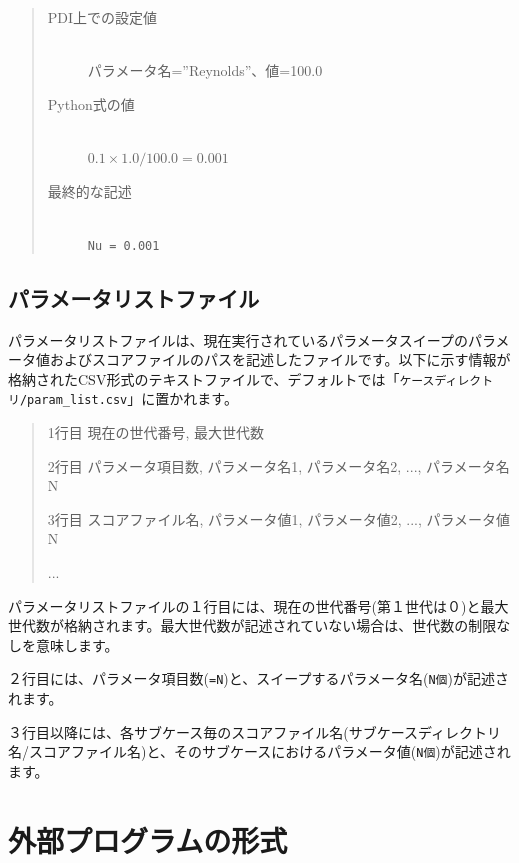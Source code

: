 \documentclass[a4paper,11pt]{jarticle}
\begin{document}
{\begin{quote}
\begin{description}
\item[PDI上での設定値] {\ }\\
パラメータ名=''Reynolds''、値=100.0

\item[Python式の値]  {\ }\\
$0.1 \times 1.0 \slash 100.0 = 0.001$

\item[最終的な記述]  {\ }\\
{\tt Nu = 0.001}
\end{description}
\end{quote}


\newpage
\subsection{{\large{}パラメータリストファイル}}

パラメータリストファイルは、現在実行されているパラメータスイープのパラメータ値およびスコアファイルのパスを記述したファイルです。以下に示す情報が格納されたCSV形式のテキストファイルで、デフォルトでは「{\tt ケースディレクトリ/param\_list.csv}」に置かれます。
\begin{tt}
\begin{quote}
1行目 現在の世代番号,  最大世代数

2行目 パラメータ項目数,  パラメータ名1,  パラメータ名2, ...,  パラメータ名N

3行目 スコアファイル名,  パラメータ値1,  パラメータ値2, ...,  パラメータ値N

...

\end{quote}
\end{tt}

パラメータリストファイルの１行目には、現在の世代番号(第１世代は０)と最大世代数が格納されます。最大世代数が記述されていない場合は、世代数の制限なしを意味します。

２行目には、パラメータ項目数({\tt =N})と、スイープするパラメータ名({\tt N個})が記述されます。

３行目以降には、各サブケース毎のスコアファイル名(サブケースディレクトリ名/スコアファイル名)と、そのサブケースにおけるパラメータ値({\tt N個})が記述されます。


\newpage
\section{外部プログラムの形式}

}
\end{document}
